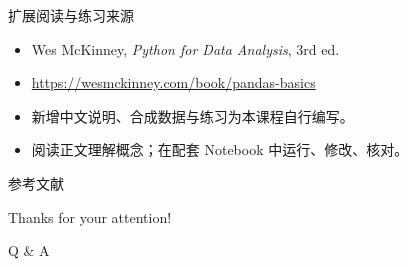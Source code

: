 \documentclass[9pt]{ctexbeamer}
\begin{document}
\begin{frame}{扩展阅读与练习来源}
\begin{itemize}
\item Wes McKinney, \textit{Python for Data Analysis}, 3rd ed.
\item \url{https://wesmckinney.com/book/pandas-basics}
\item 新增中文说明、合成数据与练习为本课程自行编写。
\item 阅读正文理解概念；在配套 Notebook 中运行、修改、核对。
\end{itemize}
\end{frame}

\appendix

\begin{frame}[allowframebreaks]{参考文献}
	
	
\end{frame}

\begin{frame}
	\begin{center}
		{\Huge\calligra Thanks for your attention!}
		\vspace{1cm}

		{\Huge Q \& A}
	\end{center}
\end{frame}
\end{document}
